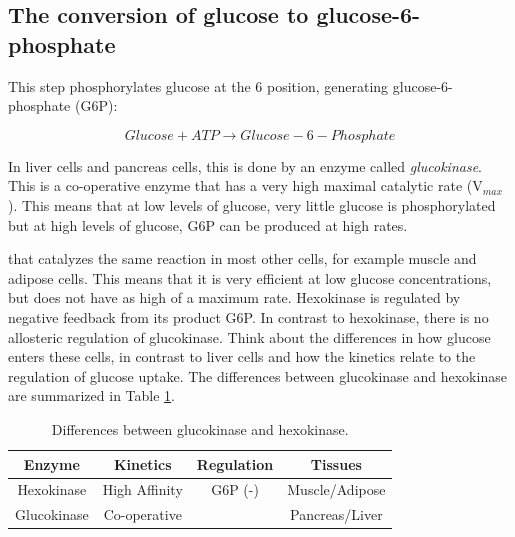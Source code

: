 \documentclass{tufte-handout}
\begin{document}
\subsection{The conversion of glucose to glucose-6-phosphate}

   This step phosphorylates glucose at the 6 position, generating glucose-6-phosphate (G6P):

\begin{equation}\label{eq:glucokinase}
Glucose + ATP \rightarrow Glucose-6-Phosphate
\end{equation}

In liver cells and pancreas cells, this is done by an enzyme called \emph{glucokinase}.  This is a co-operative enzyme that has a very high maximal catalytic rate (V$_{max}$).  This means that at low levels of glucose, very little glucose is phosphorylated but at high levels of glucose, G6P can be produced at high rates. 

 that catalyzes the same reaction in most other cells, for example muscle and adipose cells.  This means that it is very efficient at low glucose concentrations, but does not have as high of a maximum rate.  Hexokinase is regulated by negative feedback from its product G6P.  In contrast to hexokinase, there is no allosteric regulation of glucokinase.  Think about the differences in how glucose enters these cells, in contrast to liver cells and how the kinetics relate to the regulation of glucose uptake.  The differences between glucokinase and hexokinase are summarized in Table \ref{tab:glucokinase}.

\begin{table}
\centering
\caption{Differences between glucokinase and hexokinase.}
\label{tab:glucokinase}
\begin{tabular}{cccc}
\hline
\textbf {Enzyme} & \textbf{Kinetics}  & \textbf{Regulation}  & \textbf{Tissues}\\
\hline
Hexokinase & High Affinity & G6P (-) & Muscle/Adipose\\
Glucokinase & Co-operative & & Pancreas/Liver\\

\hline
\end{tabular}
\end{table}
\end{document}
